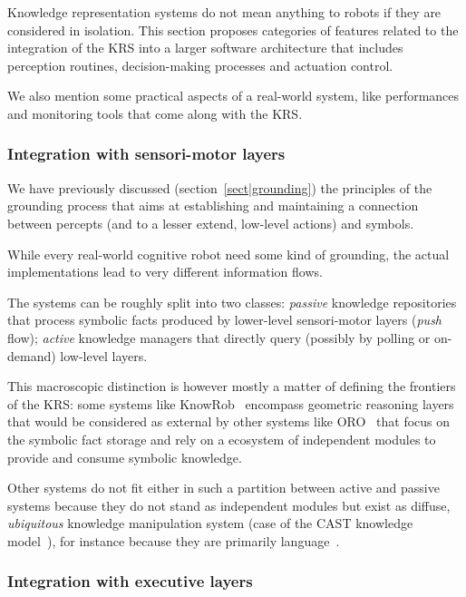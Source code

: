 \documentclass[a4paper, twocolumn]{article}
\begin{document}
Knowledge representation systems do not mean anything to robots if they are
considered in isolation. This section proposes categories of features related
to the integration of the KRS into a larger software architecture that includes
perception routines, decision-making processes and actuation control.

We also mention some practical aspects of a real-world system, like
performances and monitoring tools that come along with the KRS.

\subsubsection{Integration with sensori-motor layers}
\label{sect|integration-sensorimotor}

We have previously discussed (section~\ref{sect|grounding}) the principles of
the grounding process that aims at establishing and maintaining a connection
between percepts (and to a lesser extend, low-level actions) and symbols.

While every real-world cognitive robot need some kind of grounding, the actual
implementations lead to very different information flows.

The systems can be roughly split into two classes: \emph{passive} knowledge
repositories that process symbolic facts produced by lower-level sensori-motor
layers (\emph{push} flow); \emph{active} knowledge managers that directly query
(possibly by polling or on-demand) low-level layers.

This macroscopic distinction is however mostly a matter of defining the
frontiers of the KRS: some systems like KnowRob~\cite{Tenorth2009a} encompass
geometric reasoning layers that would be considered as external by other
systems like ORO~\cite{Lemaignan2010} that focus on the symbolic fact storage
and rely on a ecosystem of independent modules to provide and consume symbolic
knowledge.


Other systems do not fit either in such a partition between active and passive
systems because they do not stand as independent modules but exist as diffuse,
\emph{ubiquitous} knowledge manipulation system (case of the CAST knowledge
model~\cite{Jacobsson2008}), for instance because they are primarily
language~\cite{Ferrein2008, Sabri2011}.

\subsubsection{Integration with executive layers}
\label{sect|integration-executive-layers}
\end{document}
